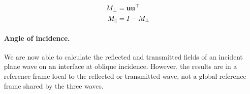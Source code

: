 \begin{subequations}
    \begin{align}
        M_\perp &= \mathbf{u} \mathbf{u}^\top   \\
        M_\parallel & = I - M_\perp
    \end{align}
    \label{eq:para_perp_decomposition_matrix}
\end{subequations}


\paragraph{Angle of incidence.}
We are now able to calculate the reflected and transmitted fields of an incident plane wave on an interface at oblique incidence.
However, the results are in a reference frame local to the reflected or transmitted wave, not a global reference frame shared by the three waves.

